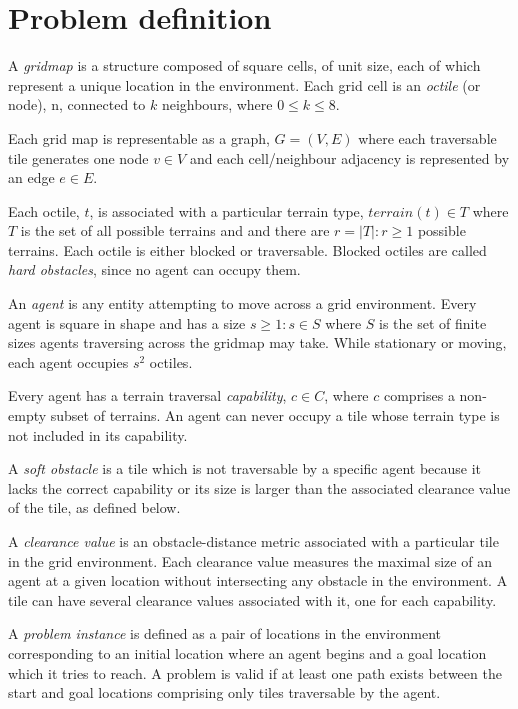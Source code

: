\section{Problem definition}
A \emph{gridmap} is a structure composed of square cells, of unit size, each of which represent a unique location in the environment. 
Each grid cell is an \emph{octile} (or node), n, connected to $k$ neighbours, where  $0 \leq k \leq 8$. 
\par \indent
Each grid map is representable as a graph, $G = (V, E)$ where each traversable tile generates one node $v \in V$ and each cell/neighbour adjacency is represented by an edge $e \in E$.
\par \indent
Each octile, $t$, is associated with a particular terrain type, $terrain(t) \in T$ where $T$ is the set of all possible terrains and and there are $r = |T| : r \geq 1$ possible terrains.
Each octile is either blocked or traversable. 
Blocked octiles are called \emph{hard obstacles}, since no agent can occupy them.
\par \indent
An \emph{agent} is any entity attempting to move across a grid environment. 
Every agent is square in shape and has a size $s \geq 1 : s \in S$ where $S$ is the set of finite sizes agents traversing across the gridmap may take.
While stationary or moving, each agent occupies $s^2$ octiles. 
\par \indent
Every agent has a terrain traversal \emph{capability}, $c \in C$, where $c$ comprises a non-empty subset of terrains.
An agent can never occupy a tile whose terrain type is not included in its capability.
\par \indent 
A \emph{soft obstacle} is a tile which is not traversable by a specific agent because it lacks the correct capability or its size is larger than the associated clearance value of the tile, as defined below. 
\par \indent
A \emph{clearance value} is an obstacle-distance metric associated with a particular tile in the grid environment. 
Each clearance value measures the maximal size of an agent at a given location without intersecting any obstacle in the environment. 
A tile can have several clearance values associated with it, one for each capability. 
\par \indent
A \emph{problem instance} is defined as a pair of locations in the environment corresponding to an initial location where an agent begins and a goal location which it tries to reach. A problem is valid if at least one path exists between the start and goal locations comprising only tiles traversable by the agent. 
